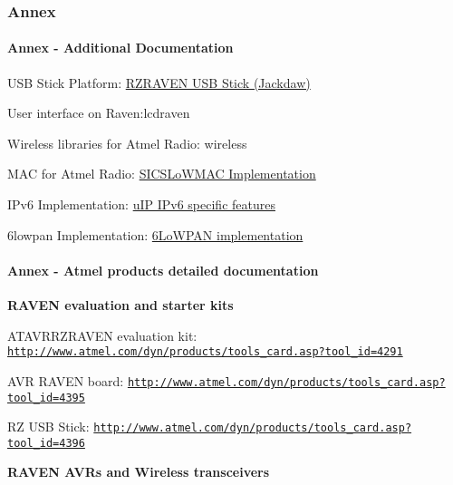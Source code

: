  \hypertarget{a00072_annex}{}\subsubsection{Annex}\label{a00072_annex}
\hypertarget{a00072_annex_contikiDocs}{}\paragraph{Annex -\/ Additional Documentation}\label{a00072_annex_contikiDocs}
\begin{DoxyItemize}
\item U\+SB Stick Platform\+: \hyperlink{a00067}{R\+Z\+R\+A\+V\+EN U\+SB Stick (Jackdaw)} \item User interface on Raven\+:lcdraven \item Wireless libraries for Atmel Radio\+: wireless \item M\+AC for Atmel Radio\+: \hyperlink{a00069}{S\+I\+C\+S\+Lo\+W\+M\+AC Implementation} \item I\+Pv6 Implementation\+: \hyperlink{a00075}{u\+IP I\+Pv6 specific features} \item 6lowpan Implementation\+: \hyperlink{a00070}{6\+Lo\+W\+P\+AN implementation}\end{DoxyItemize}
\hypertarget{a00072_annex_hardware}{}\paragraph{Annex -\/ Atmel products detailed documentation}\label{a00072_annex_hardware}
{\bfseries R\+A\+V\+EN evaluation and starter kits}~\newline
 \begin{DoxyItemize}
\item A\+T\+A\+V\+R\+R\+Z\+R\+A\+V\+EN evaluation kit\+: \href{http://www.atmel.com/dyn/products/tools_card.asp?tool_id=4291}{\tt http\+://www.\+atmel.\+com/dyn/products/tools\+\_\+card.\+asp?tool\+\_\+id=4291} \item A\+VR R\+A\+V\+EN board\+: \href{http://www.atmel.com/dyn/products/tools_card.asp?tool_id=4395}{\tt http\+://www.\+atmel.\+com/dyn/products/tools\+\_\+card.\+asp?tool\+\_\+id=4395} \item RZ U\+SB Stick\+: \href{http://www.atmel.com/dyn/products/tools_card.asp?tool_id=4396}{\tt http\+://www.\+atmel.\+com/dyn/products/tools\+\_\+card.\+asp?tool\+\_\+id=4396}\end{DoxyItemize}
{\bfseries R\+A\+V\+EN A\+V\+Rs and Wireless transceivers}~\newline
